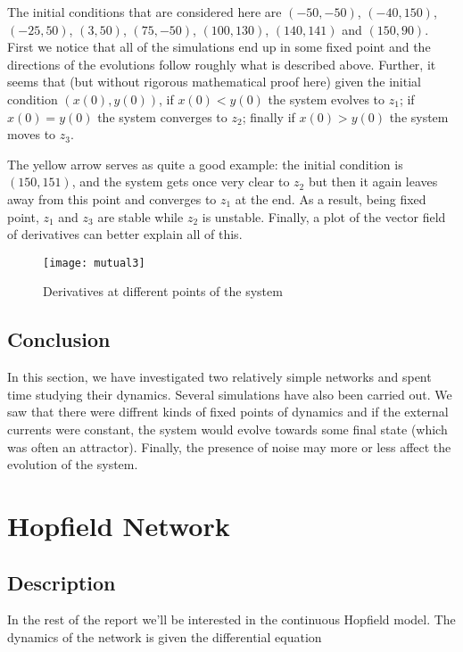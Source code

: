 The initial conditions that are considered here are $(-50, -50)$, $(-40, 150)$,
$(-25, 50)$, $(3, 50)$, $(75, -50)$, $(100, 130)$, $(140, 141)$ and 
$(150, 90)$. First we notice that all of the simulations end up in some fixed
point and the directions of the evolutions follow roughly what is described
above. Further, it seems that (but without rigorous mathematical proof here)
given the initial condition $(x(0),y(0))$, if $x(0) < y(0)$ the system evolves
to $z_1$; if $x(0) = y(0)$ the system converges to $z_2$; finally if 
$x(0) > y(0)$ the system moves to $z_3$.

The yellow arrow serves as quite a good example: the initial condition is 
$(150, 151)$, and the system gets once very clear to $z_2$ but then it again
leaves away from this point and converges to $z_1$ at the end. As a result,
being fixed point, $z_1$ and $z_3$ are stable while $z_2$ is unstable. 
Finally, a plot of the vector field of derivatives can better 
explain all of this.

\begin{figure}[H]
  \centering
  \texttt{[image: mutual3]}
  \caption{Derivatives at different points of the system}
\end{figure}

\subsection{Conclusion}

In this section, we have investigated two relatively simple networks and spent
time studying their dynamics. Several simulations have also been carried out.
We saw that there were diffrent kinds of fixed points of dynamics and if the
external currents were constant, the system would evolve towards some final 
state (which was often an attractor). Finally, the presence of noise may more
or less affect the evolution of the system.


\section{Hopfield Network}

\subsection{Description}

In the rest of the report we'll be interested in the continuous Hopfield 
model. The dynamics of the network is given the differential equation

